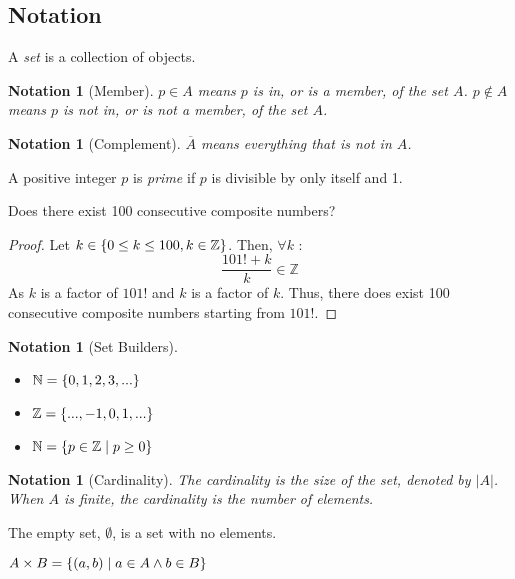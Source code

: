 \documentclass[11pt]{scrartcl}
\theoremstyle{dotlessP}
\theoremstyle{dotlessN}
\newtheorem{notation}[theorem]{Notation}
\DeclarePairedDelimiter\set{\{}{\}}
\newcommand{\ints}{\mathbb{Z}}
\newcommand{\nats}{\mathbb{N}}
\begin{document}
\subsection{Notation}
\begin{definition}
	[Set]
	A \textit{set} is a collection of objects.
\end{definition}
\begin{notation}
	[Member]
	$p \in A$ means $p$ is in, or is a member, of the set  $A$.  $p \not\in A$ means $p$ is not in, or is not a member, of the set $A$.
\end{notation}
\begin{notation}
	[Complement]
	$\overline{A}$ means everything that is not in $A$. 
\end{notation}
\begin{definition}
	A positive integer $p$ is \textit{prime} if $p$ is divisible by only itself and 1.
\end{definition}
\begin{example}
	Does there exist 100 consecutive composite numbers?
\end{example}
\begin{proof}
	Let $k \in \set*{0 \leq k \leq 100, k \in \ints}$. Then, $\forall k$ :
	\[
		\frac{101! + k}{k} \in \ints
	\] 
	As $k$ is a factor of $101!$ and $k$ is a factor of  $k$. Thus, there does exist 100 consecutive composite numbers starting from $101!$.
\end{proof}
\begin{notation}
	[Set Builders]
	\
	\begin{itemize}
		\item $\nats = \set*{0,1,2,3,...}$
		\item $\ints = \set*{...,-1,0,1,...}$
		\item $\nats = \set*{p \in \ints \mid p \geq 0}$
	\end{itemize}
\end{notation}	
\begin{notation}
	[Cardinality]
	The cardinality is the size of the set, denoted by $|A|$. When  $A$ is finite, the cardinality is the number of elements.
\end{notation}
\begin{definition}
	The empty set, $\emptyset$, is a set with no elements.
\end{definition}
\begin{definition}
	$A \times B = \set*{(a,b) \mid a \in A \land b \in B}$
\end{definition}
\end{document}
